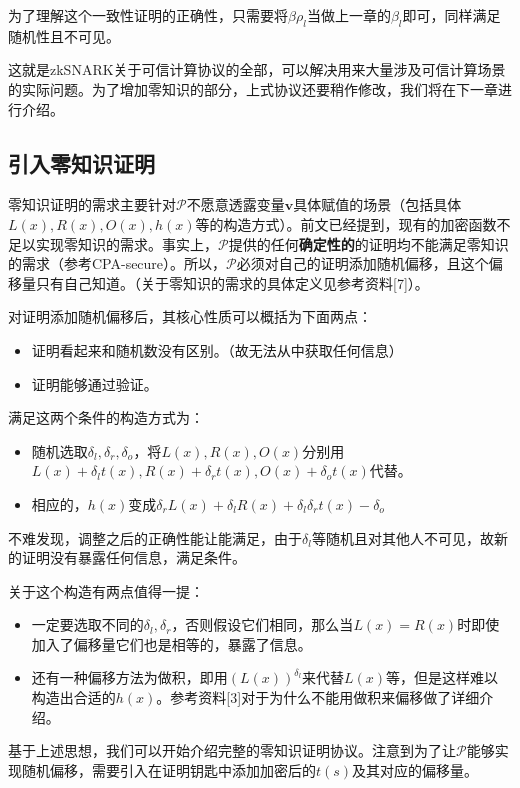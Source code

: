 \documentclass[12pt]{article}
\newcommand{\zk}{zkSNARK}
\newcommand{\pp}{$\mathcal{P}$}
\begin{document}
为了理解这个一致性证明的正确性，只需要将$\beta \rho_l$当做上一章的$\beta_l$即可，同样满足随机性且不可见。

这就是\zk 关于可信计算协议的全部，可以解决用来大量涉及可信计算场景的实际问题。为了增加零知识的部分，上式协议还要稍作修改，我们将在下一章进行介绍。
\subsection{引入零知识证明}
零知识证明的需求主要针对\pp 不愿意透露变量$\bm{v}$具体赋值的场景（包括具体$L(x),R(x),O(x),h(x)$等的构造方式）。前文已经提到，现有的加密函数不足以实现零知识的需求。事实上，\pp 提供的任何\textbf{确定性的}的证明均不能满足零知识的需求（参考CPA-secure）。所以，\pp 必须对自己的证明添加随机偏移，且这个偏移量只有自己知道。（关于零知识的需求的具体定义见参考资料[7]）。

对证明添加随机偏移后，其核心性质可以概括为下面两点：
\begin{itemize}
	\item 证明看起来和随机数没有区别。（故无法从中获取任何信息）
	\item 证明能够通过验证。
\end{itemize}
满足这两个条件的构造方式为：
\begin{itemize}
	\item 随机选取$\delta_l,\delta_r,\delta_o$，将$L(x),R(x),O(x)$分别用$L(x)+\delta_l t(x),R(x)+\delta_r t(x),O(x)+\delta_o t(x)$代替。
	\item 相应的，$h(x)$变成$\delta_r L(x)+\delta_l R(x)+\delta_l\delta_r t(x)-\delta_o$
\end{itemize}
不难发现，调整之后的正确性能让能满足，由于$\delta_l$等随机且对其他人不可见，故新的证明没有暴露任何信息，满足条件。

关于这个构造有两点值得一提：
\begin{itemize}
	 \item 一定要选取不同的$\delta_l,\delta_r$，否则假设它们相同，那么当$L(x)=R(x)$时即使加入了偏移量它们也是相等的，暴露了信息。
	 \item 还有一种偏移方法为做积，即用$(L(x))^{\delta_l}$来代替$L(x)$等，但是这样难以构造出合适的$h(x)$。参考资料[3]对于为什么不能用做积来偏移做了详细介绍。
\end{itemize}
基于上述思想，我们可以开始介绍完整的零知识证明协议。注意到为了让\pp 能够实现随机偏移，需要引入在证明钥匙中添加加密后的$t(s)$及其对应的偏移量。
\end{document}
